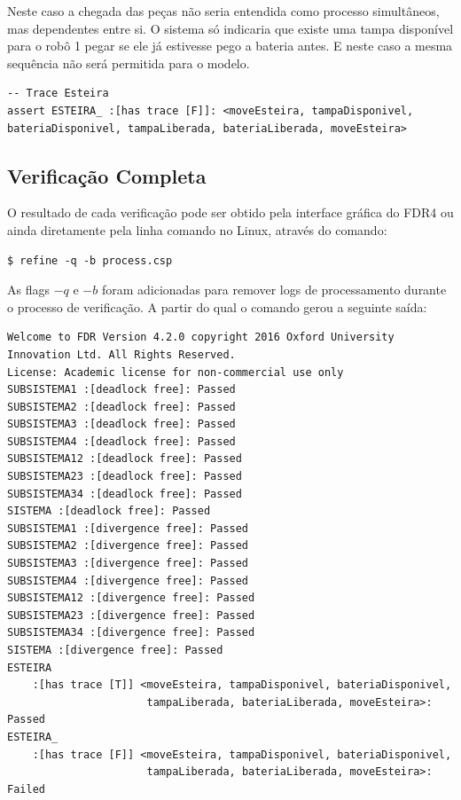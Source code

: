 \documentclass[a4paper,11pt,twocolumns]{article}
\begin{document}
Neste caso a chegada das peças não seria entendida como processo simultâneos, mas dependentes entre si. O sistema só indicaria que existe uma tampa disponível para o robô 1 pegar se ele já estivesse pego a bateria antes. E neste caso a mesma sequência não será permitida para o modelo.

\begin{verbatim}
-- Trace Esteira
assert ESTEIRA_ :[has trace [F]]: <moveEsteira, tampaDisponivel, bateriaDisponivel, tampaLiberada, bateriaLiberada, moveEsteira>
\end{verbatim}


\subsection{Verificação Completa}
O resultado de cada verificação pode ser obtido pela interface gráfica do FDR4 ou ainda diretamente pela linha comando no Linux, através do comando:

\begin{verbatim}
$ refine -q -b process.csp
\end{verbatim}

As flags $-q$ e $-b$ foram adicionadas para remover logs de processamento durante o processo de verificação. A partir do qual o comando gerou a seguinte saída:

\begin{verbatim}
Welcome to FDR Version 4.2.0 copyright 2016 Oxford University Innovation Ltd. All Rights Reserved.
License: Academic license for non-commercial use only
SUBSISTEMA1 :[deadlock free]: Passed
SUBSISTEMA2 :[deadlock free]: Passed
SUBSISTEMA3 :[deadlock free]: Passed
SUBSISTEMA4 :[deadlock free]: Passed
SUBSISTEMA12 :[deadlock free]: Passed
SUBSISTEMA23 :[deadlock free]: Passed
SUBSISTEMA34 :[deadlock free]: Passed
SISTEMA :[deadlock free]: Passed
SUBSISTEMA1 :[divergence free]: Passed
SUBSISTEMA2 :[divergence free]: Passed
SUBSISTEMA3 :[divergence free]: Passed
SUBSISTEMA4 :[divergence free]: Passed
SUBSISTEMA12 :[divergence free]: Passed
SUBSISTEMA23 :[divergence free]: Passed
SUBSISTEMA34 :[divergence free]: Passed
SISTEMA :[divergence free]: Passed
ESTEIRA
    :[has trace [T]] <moveEsteira, tampaDisponivel, bateriaDisponivel,
                      tampaLiberada, bateriaLiberada, moveEsteira>: Passed
ESTEIRA_
    :[has trace [F]] <moveEsteira, tampaDisponivel, bateriaDisponivel,
                      tampaLiberada, bateriaLiberada, moveEsteira>: Failed
\end{verbatim}
\end{document}
